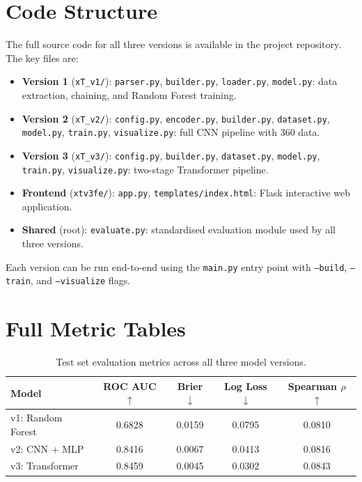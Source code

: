 \documentclass{article}
\begin{document}
\begin{appendices}

\section{Code Structure}

The full source code for all three versions is available in the project repository. The key files are:

\begin{itemize}
    \item \textbf{Version 1} (\texttt{xT\_v1/}): \texttt{parser.py}, \texttt{builder.py}, \texttt{loader.py}, \texttt{model.py}: data extraction, chaining, and Random Forest training.
    \item \textbf{Version 2} (\texttt{xT\_v2/}): \texttt{config.py}, \texttt{encoder.py}, \texttt{builder.py}, \texttt{dataset.py}, \texttt{model.py}, \texttt{train.py}, \texttt{visualize.py}: full CNN pipeline with 360 data.
    \item \textbf{Version 3} (\texttt{xT\_v3/}): \texttt{config.py}, \texttt{builder.py}, \texttt{dataset.py}, \texttt{model.py}, \texttt{train.py}, \texttt{visualize.py}: two-stage Transformer pipeline.
    \item \textbf{Frontend} (\texttt{xtv3fe/}): \texttt{app.py}, \texttt{templates/index.html}: Flask interactive web application.
    \item \textbf{Shared} (root): \texttt{evaluate.py}: standardised evaluation module used by all three versions.
\end{itemize}

Each version can be run end-to-end using the \texttt{main.py} entry point with \texttt{--build}, \texttt{--train}, and \texttt{--visualize} flags.

\section{Full Metric Tables}

\begin{table}[h]
\centering
\caption{Test set evaluation metrics across all three model versions.}
\begin{tabular}{lcccc}
\toprule
\textbf{Model} & \textbf{ROC AUC} $\uparrow$ & \textbf{Brier} $\downarrow$ & \textbf{Log Loss} $\downarrow$ & \textbf{Spearman $\rho$} $\uparrow$ \\
\midrule
v1: Random Forest  & 0.6828 & 0.0159 & 0.0795 & 0.0810 \\
v2: CNN + MLP      & 0.8416 & 0.0067 & 0.0413 & 0.0816 \\
v3: Transformer    & 0.8459 & 0.0045 & 0.0302 & 0.0843 \\
\bottomrule
\end{tabular}
\label{tab:metrics_full}
\end{table}


\end{appendices}
\end{document}
